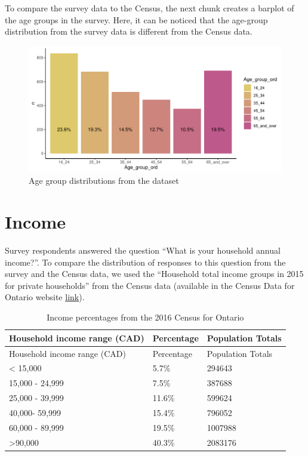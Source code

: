 \documentclass[
  letterpaper,
  DIV=11,
  numbers=noendperiod]{scrartcl}
\begin{document}
To compare the survey data to the Census, the next chunk creates a
barplot of the age groups in the survey. Here, it can be noticed that
the age-group distribution from the survey data is different from the
Census data.

\begin{figure}

{\centering \includegraphics{appendix_files/figure-pdf/trends-by-age-1.pdf}

}

\caption{Age group distributions from the dataset}

\end{figure}

\hypertarget{income}{%
\section{Income}\label{income}}

Survey respondents answered the question ``What is your household annual
income?''. To compare the distribution of responses to this question
from the survey and the Census data, we used the ``Household total
income groups in 2015 for private households'' from the Census data
(available in the Census Data for Ontario website
\href{https://www12.statcan.gc.ca/census-recensement/2016/dp-pd/prof/details/page.cfm?Lang=E\&Geo1=PR\&Code1=35\&Geo2=PR\&Code2=01\&SearchText=Ontario\&SearchType=Begins\&SearchPR=01\&B1=Income\&TABID=1\&type=1}{link}).

\begin{longtable}[]{@{}lll@{}}
\caption{Income percentages from the 2016 Census for
Ontario}\tabularnewline
\toprule()
Household income range (CAD) & Percentage & Population Totals \\
\midrule()
\endfirsthead
\toprule()
Household income range (CAD) & Percentage & Population Totals \\
\midrule()
\endhead
\textless{} 15,000 & 5.7\% & 294643 \\
15,000 - 24,999 & 7.5\% & 387688 \\
25,000 - 39,999 & 11.6\% & 599624 \\
40,000- 59,999 & 15.4\% & 796052 \\
60,000 - 89,999 & 19.5\% & 1007988 \\
\textgreater90,000 & 40.3\% & 2083176 \\
\bottomrule()
\end{longtable}
\end{document}
